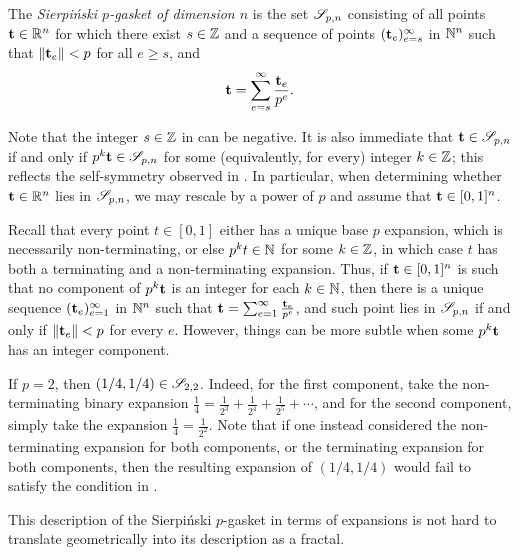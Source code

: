 \documentclass{amsart}
\begin{document}
\begin{definition}
   \label{sierpinski: D}
   The \emph{Sierpi\'nski $p$-gasket of dimension $n$} is the set $\mathscr{S}_{p,n}$ consisting of all points $\mathbf{t}\in \mathbb{R}^n$ for which there exist $s \in \mathbb{Z}$ and a sequence of points $( \mathbf{t}_e )_{e=s}^\infty$ in $\mathbb{N}^n$ such that $\| \mathbf{t}_e \| < p$ for all $e \geq s$, and
 \[
\mathbf{t} = \sum_{e=s}^{\infty} \frac{\mathbf{t}_e}{p^e}.
 \]
\end{definition}

Note that the integer $s \in \mathbb{Z}$ in  can be negative.
It is also immediate that $\mathbf{t} \in \mathscr{S}_{p,n}$ if and only if $p^k  \mathbf{t} \in \mathscr{S}_{p,n}$ for some (equivalently, for every) integer $k \in \mathbb{Z}$; this reflects the self-symmetry observed in .
In particular, when determining whether $\mathbf{t} \in \mathbb{R}^n$ lies in $\mathscr{S}_{p,n}$, we may rescale by a power of $p$  and assume that $\mathbf{t} \in [0,1]^n$.

Recall that every point $t \in [0,1]$ either has a unique base $p$ expansion, which is necessarily non-terminating, or else $p^k t \in \mathbb{N}$ for some $k \in \mathbb{Z}$, in which case $t$ has both a terminating and a non-terminating expansion.
Thus, if $\mathbf{t} \in [0,1]^n$ is such that no component of $p^k \mathbf{t}$ is an integer for each $k \in \mathbb{N}$, then there is a unique sequence $( \mathbf{t}_e )_{e=1}^{\infty}$ in $ \mathbb{N}^n$ such that $\mathbf{t} = \sum_{e=1}^{\infty} \frac{\mathbf{t}_e}{p^e}$, and such point lies in ${\mathscr{S}}_{p,n}$ if and only if $\| \mathbf{t}_e \| < p$ for every  $e$.
However, things can be more subtle when some $p^k \mathbf{t}$ has an integer component.

\begin{example}
   If $p=2$, then $(1/4, 1/4) \in \mathscr{S}_{2,2}$.
   Indeed, for the first component, take the non-terminating binary expansion $\frac{1}{4} = \frac{1}{2^3} + \frac{1}{2^4} + \frac{1}{2^5} + \cdots$, and for the second component, simply take the expansion $\frac{1}{4} = \frac{1}{2^2}$.
   Note that if one instead considered the non-terminating expansion for both components, or the terminating expansion for both components, then the resulting expansion of $(1/4, 1/4)$ would fail to satisfy the condition in .
\end{example}

This description of the Sierpi\'nski $p$-gasket in terms of expansions is not hard to translate geometrically into its description as a fractal.
\end{document}
